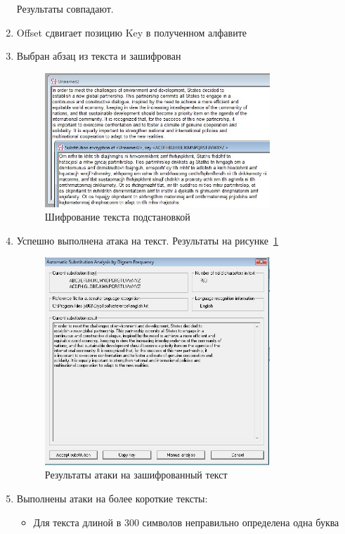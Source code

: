 \documentclass[a4paper, 14pt]{extarticle}
\begin{document}
\begin{enumerate}
    Результаты совпадают.
    \item Offset сдвигает позицию Key в полученном алфавите
    \item Выбран абзац из текста и зашифрован
    \begin{figure}[h]
        \centering
        \includegraphics[width=0.8\textwidth]{./img/S002.jpg}
        \caption{Шифрование текста подстановкой}
    \end{figure}
    \item Успешно выполнена атака на текст. Результаты на рисунке~\ref{img:1:3}
    \begin{figure}[h]
        \centering
        \includegraphics[width=0.8\textwidth]{./img/S003.jpg}
        \caption{Результаты атаки на зашифрованный текст}%
        \label{img:1:3}
    \end{figure}
    \item Выполнены атаки на более короткие тексты:
    \begin{itemize}
        \item Для текста длиной в 300 символов неправильно определена одна буква

\end{itemize}
\end{enumerate}
\end{document}
